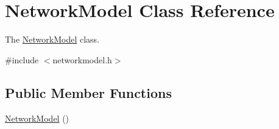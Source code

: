 \hypertarget{class_network_model}{}\section{Network\+Model Class Reference}
\label{class_network_model}


The \hyperlink{class_network_model}{Network\+Model} class.  




{\ttfamily \#include $<$networkmodel.\+h$>$}

\subsection*{Public Member Functions}
\begin{DoxyCompactItemize}
\item 
\hyperlink{class_network_model_a680923e0ff3293e1ac1853c5bfff6626}{Network\+Model} ()\hypertarget{class_network_model_a680923e0ff3293e1ac1853c5bfff6626}{}\label{class_network_model_a680923e0ff3293e1ac1853c5bfff6626}


\end{DoxyCompactItemize}
